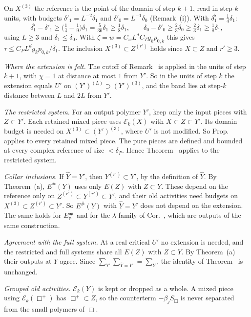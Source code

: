 \begin{detail}
\begin{step}
On $X^{(3)}$ the reference is the point of the domain of step $k+1$, read in step-$k$ units, with budgets $\delta'_1=L^{-2}\delta_1$ and $\delta'_0=L^{-1}\delta_0$ (Remark~(i)). With $\delta^\flat_1=\frac14\delta_1$:
\[
\delta^\flat_1-\delta'_1\ge\big(\tfrac14-\tfrac19\big)\delta_1=\tfrac5{36}\delta_1\ge\tfrac18\delta_1,\qquad\delta_0-\delta'_0\ge\tfrac23\delta_0\ge\tfrac23\delta_1\ge\tfrac18\delta_1,
\]
using $L\ge3$ and $\delta_1\le\delta_0$. With $\zeta=w=C_wL^dC_Tg_kp_{0,k}$ this gives $\tau\le C_PL^dg_kp_{0,k}/\delta_1$. The inclusion $X^{(3)}\subset Z^{(r')}$ holds since $X\subset Z$ and $r'\ge3$.
\end{step}
\end{detail}

\begin{detail}\label{xa:d-ext}
\emph{Where the extension is felt.} The cutoff of Remark~ is applied in the units of step $k+1$, with $\chi=1$ at distance at most $1$ from $Y'$. So in the units of step $k$ the extension equals $U'$ on $(Y')^{(L)}\supset(Y')^{(3)}$, and the band lies at step-$k$ distance between $L$ and $2L$ from $Y'$.

\emph{The restricted system.} For an output polymer $Y'$, keep only the input pieces with $Z\subset Y'$. Each retained mixed piece uses $\mathcal E_k(X)$ with $X\subset Z\subset Y'$. Its domain budget is needed on $X^{(3)}\subset(Y')^{(3)}$, where $U'$ is not modified. So Prop.~ applies to every retained mixed piece. The pure pieces are defined and bounded at every complex reference of size $<\delta_P$. Hence Theorem~ applies to the restricted system.

\emph{Collar inclusions.} If $\hat Y=Y'$, then $Y^{(r')}\subset Y'$, by the definition of $\hat Y$. By Theorem~(a), $E^\#(Y)$ uses only $E(Z)$ with $Z\subset Y$. These depend on the reference only on $Z^{(r')}\subset Y^{(r')}\subset Y'$, and their old activities need budgets on $X^{(3)}\subset Z^{(r')}\subset Y'$. So $E^\#(Y)$ with $\hat Y=Y'$ does not depend on the extension. The same holds for $E^\#_{\rm p}$ and for the $\lambda$-family of Cor.~, which are outputs of the same construction.

\emph{Agreement with the full system.} At a real critical $U'$ no extension is needed, and the restricted and full systems share all $E(Z)$ with $Z\subset Y$. By Theorem~(a) their outputs at $Y$ agree. Since $\sum_{Y'}\sum_{\hat Y=Y'}=\sum_Y$, the identity of Theorem~ is unchanged.

\emph{Grouped old activities.} $\mathcal E_k(Y)$ is kept or dropped as a whole. A mixed piece using $\mathcal E_k(\Box^+)$ has $\Box^+\subset Z$, so the counterterm $-\beta_jS_\Box$ is never separated from the small polymers of $\Box$.
\end{detail}

